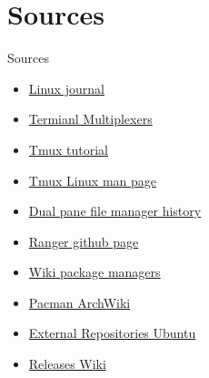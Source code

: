 \documentclass[usenames,dvipsnames,10pt,aspectratio=169]{beamer}
\begin{document}
\section{Sources}
\begin{frame}{Sources}
    \begin{itemize}
        \item \href{https://www.linuxjournal.com/node/1203742}{Linux journal}
        \item \href{https://opensource.com/article/21/5/linux-terminal-multiplexer}{Termianl Multiplexers}
        \item \href{https://protechnotes.com/comprehensive-tmux-tutorial-for-beginners-with-a-cheat-sheet/}{Tmux tutorial}
        \item \href{https://man7.org/linux/man-pages/man1/tmux.1.html}{Tmux Linux man page}
        \item \href{https://fman.io/blog/dual-pane-file-manager-history/}{Dual pane file manager history}
        \item \href{https://github.com/ranger/ranger}{Ranger github page}
        \item \href{https://en.wikipedia.org/wiki/Package_manager}{Wiki package managers}
        \item \href{https://wiki.archlinux.org/title/pacman}{Pacman ArchWiki}
        \item \href{https://itsfoss.com/adding-external-repositories-ubuntu/}{External Repositories Ubuntu}
        \item \href{https://en.wikipedia.org/wiki/Rolling_release}{Releases Wiki}
    \end{itemize}
\end{frame}
\end{document}
